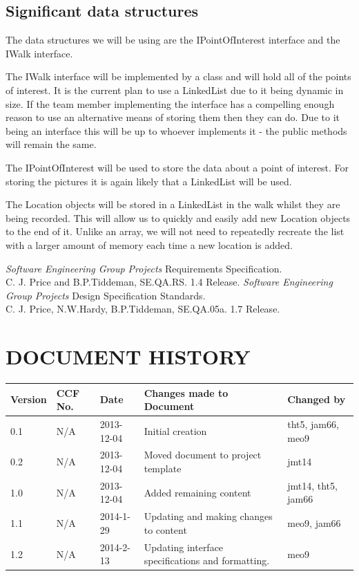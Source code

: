 \documentclass{project}
\begin{document}
\subsection{Significant data structures}
The data structures we will be using are the IPointOfInterest interface and the
IWalk interface.

The IWalk interface will be implemented by a class and will hold all of the
points of interest. It is the current plan to use a LinkedList due to it being
dynamic in size. If the team member implementing the interface has a compelling
enough reason to use an alternative means of storing them then they can do. Due
to it being an interface this will be up to whoever implements it - the public
methods will remain the same.

The IPointOfInterest will be used to store the data about a point of interest.
For storing the pictures it is again likely that a LinkedList will be used.

The Location objects will be stored in a LinkedList in the walk
whilst they are being recorded. This will allow us to quickly and easily add
new Location objects to the end of it. Unlike an array, we will not need to
repeatedly recreate the list with a larger amount of memory each time a new
location is added.

\clearpage
{}
\begin{thebibliography}{5}
 \emph{Software Engineering Group Projects}
Requirements Specification. \\
C. J. Price and B.P.Tiddeman, SE.QA.RS. 1.4 Release.
 \emph{Software Engineering Group Projects}
Design Specification Standards. \\
C. J. Price, N.W.Hardy, B.P.Tiddeman, SE.QA.05a. 1.7 Release.
\end{thebibliography}
\section*{DOCUMENT HISTORY}
\begin{tabular}{|l | l | l | l | l |}
\hline
Version & CCF No. & Date & Changes made to Document & Changed by \\
\hline
0.1 & N/A & 2013-12-04 & Initial creation & tht5, jam66, meo9 \\
\hline
0.2 & N/A & 2013-12-04 & Moved document to project template & jmt14 \\
\hline
1.0 & N/A & 2013-12-04 & Added remaining content & jmt14, tht5, jam66 \\
\hline
1.1 & N/A & 2014-1-29 & Updating and making changes to content & meo9, jam66 \\
\hline
1.2 & N/A & 2014-2-13 & Updating interface specifications and formatting. & meo9 \\
\hline
\end{tabular}
\label{thelastpage}
\end{document}
